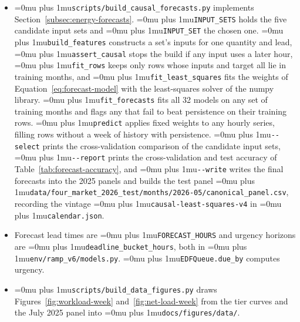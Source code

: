 \documentclass{UNCC-thesis}
\newcommand{\codepath}[1]{{\Urlmuskip=0mu plus 1mu\relax\nolinkurl{#1}}}
\begin{document}
\begin{itemize}
  \item \codepath{scripts/build_causal_forecasts.py} implements
        Section~\ref{subsec:energy-forecasts}. \codepath{INPUT_SETS} holds
        the five candidate input sets and \codepath{INPUT_SET} the chosen
        one. \codepath{build_features} constructs a set's inputs for one
        quantity and lead, \codepath{assert_causal} stops the build if any
        input uses a later hour, \codepath{fit_rows} keeps only rows whose inputs and target
        all lie in training months, and \codepath{fit_least_squares} fits the
        weights of Equation~\eqref{eq:forecast-model} with the least-squares
        solver of the numpy library. \codepath{fit_forecasts} fits all 32
        models on any set of training months and flags any that fail to beat
        persistence on their training rows. \codepath{predict}
        applies fixed weights to any hourly series, filling rows without a
        week of history with persistence. \codepath{--select} prints the
        cross-validation comparison of the candidate input sets,
        \codepath{--report} prints the
        cross-validation and test accuracy of
        Table~\ref{tab:forecast-accuracy}, and \codepath{--write} writes the
        final forecasts into the 2025 panels and builds the test panel
        \codepath{data/four_market_2026_test/months/2026-05/canonical_panel.csv},
        recording the vintage \codepath{causal-least-squares-v4} in
        \codepath{calendar.json}.
  \item Forecast lead times are \codepath{FORECAST_HOURS} and urgency horizons
        are \codepath{deadline_bucket_hours}, both in
        \codepath{env/ramp_v6/models.py}. \codepath{EDFQueue.due_by} computes
        urgency.
  \item \codepath{scripts/build_data_figures.py} draws
        Figures~\ref{fig:workload-week} and~\ref{fig:net-load-week} from the
        tier curves and the July 2025 panel into
        \codepath{docs/figures/data/}.
\end{itemize}
\end{document}
